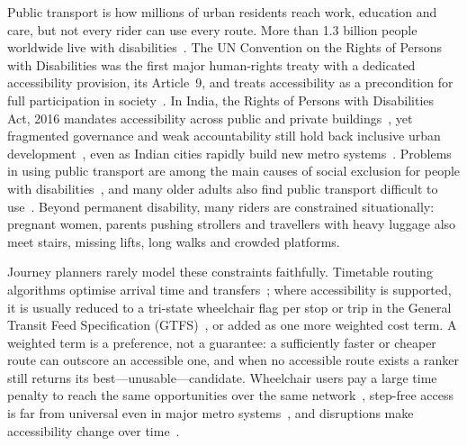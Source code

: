 \documentclass[conference]{IEEEtran}
\begin{document}
Public transport is how millions of urban residents reach work, education and care, but not every rider can use every route. More than 1.3 billion people worldwide live with disabilities~\cite{elorduy2025burgos}. The UN Convention on the Rights of Persons with Disabilities was the first major human-rights treaty with a dedicated accessibility provision, its Article~9, and treats accessibility as a precondition for full participation in society~\cite{ferri2025embodied,bose2025socialaudit}. In India, the Rights of Persons with Disabilities Act, 2016 mandates accessibility across public and private buildings~\cite{bose2025socialaudit}, yet fragmented governance and weak accountability still hold back inclusive urban development~\cite{gupta2026governing}, even as Indian cities rapidly build new metro systems~\cite{kuriakose2025metro}. Problems in using public transport are among the main causes of social exclusion for people with disabilities~\cite{elorduy2025review}, and many older adults also find public transport difficult to use~\cite{gu2024older}. Beyond permanent disability, many riders are constrained situationally: pregnant women, parents pushing strollers and travellers with heavy luggage also meet stairs, missing lifts, long walks and crowded platforms.

Journey planners rarely model these constraints faithfully. Timetable routing algorithms optimise arrival time and transfers~\cite{agarwal2024tbtr,grossmann2026flash}; where accessibility is supported, it is usually reduced to a tri-state wheelchair flag per stop or trip in the General Transit Feed Specification (GTFS)~\cite{gtfs}, or added as one more weighted cost term. A weighted term is a preference, not a guarantee: a sufficiently faster or cheaper route can outscore an accessible one, and when no accessible route exists a ranker still returns its best---unusable---candidate. Wheelchair users pay a large time penalty to reach the same opportunities over the same network~\cite{hernandez2023wheelchair}, step-free access is far from universal even in major metro systems~\cite{moran2026stairway,arai2026elevator}, and disruptions make accessibility change over time~\cite{liu2024disruptions}.
\end{document}
